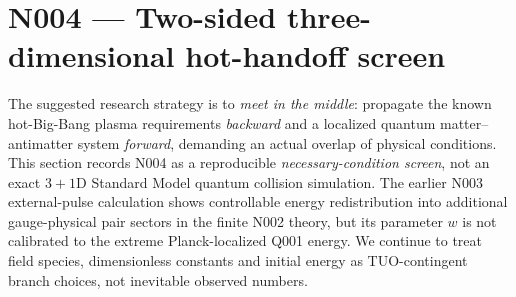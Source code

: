 \documentclass[11pt,a4paper]{article}
\theoremstyle{tmon}
\theoremstyle{definition}
\begin{document}
\section{N004 --- Two-sided three-dimensional hot-handoff screen}\label{sec:n004}
The suggested research strategy is to \emph{meet in the middle}: propagate the known hot-Big-Bang plasma requirements \emph{backward} and a localized quantum matter--antimatter system \emph{forward}, demanding an actual overlap of physical conditions. This section records N004 as a reproducible \emph{necessary-condition screen}, not an exact $3+1$D Standard Model quantum collision simulation. The earlier N003 external-pulse calculation shows controllable energy redistribution into additional gauge-physical pair sectors in the finite N002 theory, but its parameter $w$ is not calibrated to the extreme Planck-localized Q001 energy. We continue to treat field species, dimensionless constants and initial energy as TUO-contingent branch choices, not inevitable observed numbers.
\end{document}
